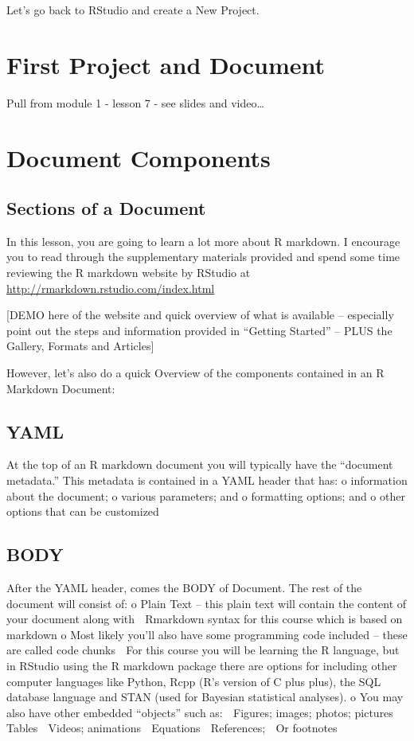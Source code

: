 \documentclass[]{book}
\theoremstyle{definition}
\theoremstyle{definition}
\theoremstyle{definition}
\theoremstyle{remark}
\begin{document}
Let's go back to RStudio and create a New Project.

\chapter{First Project and Document}\label{firstproject}

Pull from module 1 - lesson 7 - see slides and video\ldots{}

\chapter{Document Components}\label{doccomponents}

\section{Sections of a Document}\label{sections-of-a-document}

In this lesson, you are going to learn a lot more about R markdown. I
encourage you to read through the supplementary materials provided and
spend some time reviewing the R markdown website by RStudio at
\url{http://rmarkdown.rstudio.com/index.html}

{[}DEMO here of the website and quick overview of what is available --
especially point out the steps and information provided in ``Getting
Started'' -- PLUS the Gallery, Formats and Articles{]}

However, let's also do a quick Overview of the components contained in
an R Markdown Document:

\section{YAML}\label{yaml}

At the top of an R markdown document you will typically have the
``document metadata.'' This metadata is contained in a YAML header that
has: o information about the document; o various parameters; and o
formatting options; and o other options that can be customized

\section{BODY}\label{body}

After the YAML header, comes the BODY of Document. The rest of the
document will consist of: o Plain Text -- this plain text will contain
the content of your document along with  Rmarkdown syntax for this
course which is based on markdown o Most likely you'll also have some
programming code included -- these are called code chunks  For this
course you will be learning the R language, but in RStudio using the R
markdown package there are options for including other computer
languages like Python, Rcpp (R's version of C plus plus), the SQL
database language and STAN (used for Bayesian statistical analyses). o
You may also have other embedded ``objects'' such as:  Figures; images;
photos; pictures  Tables  Videos; animations  Equations  References;
 Or footnotes
\end{document}
